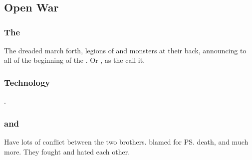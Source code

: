\chapter{\SecondbanewarBook}















\section{Open War}









\subsection{The \secondbanewar}
\index{\secondbanewar}
The dreaded \satharioth{} march forth, legions of \banes{} and monsters at their back, 
announcing to all of \Miith{} the beginning of the \secondbanewar.
Or , as the \resphain{} call it. 









\subsection{Technology}
.











\subsection{\Ishnaruchaefir{} and \Secherdamon}
Have lots of conflict between the two brothers. 
\Secherdamon{} blamed \Ishnaruchaefir{} for \ps{\Nexagglachel} death, and much more. 
They fought and hated each other. 

